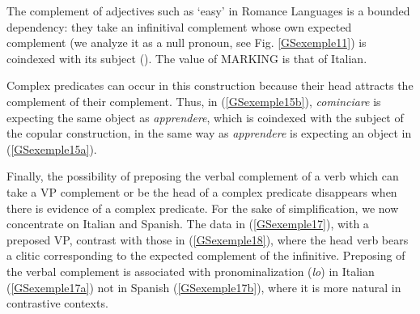 \documentclass[output=paper
                ,modfonts
                ,nonflat
	        ,collection
	        ,collectionchapter
	        ,collectiontoclongg
 	        ,biblatex
                ,babelshorthands
                ,newtxmath
                ,draftmode
                ,colorlinks, citecolor=brown
]{./langsci/langscibook}
\begin{document}
{	\label{GSexemple15b}
		
	\label{GSexemple15c} 	
\zl

The complement of adjectives such as `easy' in Romance Languages is a bounded dependency: they take an infinitival complement whose own expected complement (we analyze it as a null pronoun, see Fig. \ref{GSexemple11}) is coindexed with its subject (\citealt{AGS1998, Monachesi98a}). The value of MARKING is that of Italian.

\begin{exe}
\end{exe}

Complex predicates can occur in this construction because their head attracts the complement of their complement. Thus, in (\ref{GSexemple15b}), \emph{cominciare} is expecting the same object as \emph{apprendere}, which is coindexed with the subject of the copular construction, in the same way as \emph{apprendere} is expecting an object in (\ref{GSexemple15a}). 

Finally, the possibility of preposing the verbal complement of a verb which can take a VP complement or be the head of a complex predicate disappears when there is evidence of a complex predicate. For the sake of simplification, we now concentrate on Italian and Spanish. The data in (\ref{GSexemple17}), with a preposed VP, contrast with those in (\ref{GSexemple18}), where the head verb bears a clitic corresponding to the expected complement of the infinitive. Preposing of the verbal complement is associated with pronominalization (\emph{lo}) in Italian (\ref{GSexemple17a}) not in Spanish (\ref{GSexemple17b}), where it is more natural in contrastive contexts.

}
\end{document}
